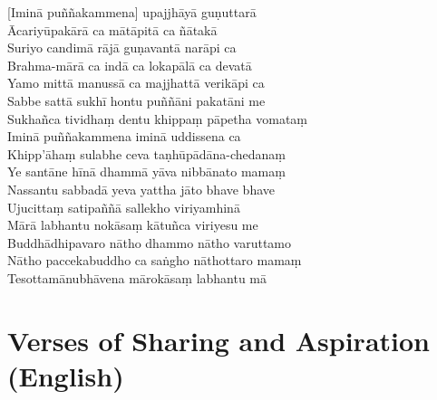 [Iminā puññakammena] upajjhāyā guṇuttarā\\
Ācariyūpakārā ca mātāpitā ca ñātakā\\
Suriyo candimā rājā guṇavantā narāpi ca\\
Brahma-mārā ca indā ca lokapālā ca devatā\\
Yamo mittā manussā ca majjhattā verikāpi ca\\
Sabbe sattā sukhī hontu puññāni pakatāni me\\
Sukhañca tividhaṃ dentu khippaṃ pāpetha vomataṃ\\
Iminā puññakammena iminā uddissena ca\\
Khipp'āhaṃ sulabhe ceva taṇhūpādāna-chedanaṃ\\
Ye santāne hīnā dhammā yāva nibbānato mamaṃ\\
Nassantu sabbadā yeva yattha jāto bhave bhave\\
Ujucittaṃ satipaññā sallekho viriyamhinā\\
Mārā labhantu nokāsaṃ kātuñca viriyesu me\\
Buddhādhipavaro nātho dhammo nātho varuttamo\\
Nātho paccekabuddho ca saṅgho nāthottaro mamaṃ\\
Tesottamānubhāvena mārokāsaṃ labhantu mā


\section{Verses of Sharing and Aspiration (English)}

\begin{leader}
\end{leader}


